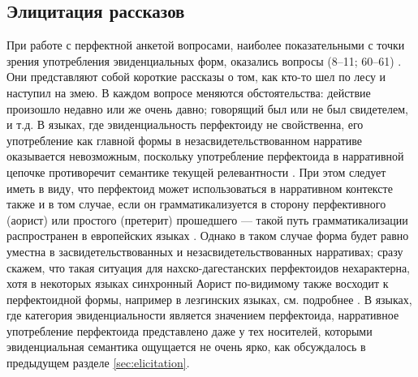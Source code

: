 \subsection{Элицитация рассказов} \label{sec:andinarr}

При работе с перфектной анкетой вопросами, наиболее показательными с точки зрения употребления эвиденциальных форм, оказались вопросы (8--11; 60--61) \citep[800--809]{dahl2000}. Они представляют собой короткие рассказы о том, как кто-то шел по лесу и наступил на змею. В каждом вопросе меняются обстоятельства: действие произошло недавно или же очень давно; говорящий был или не был свидетелем, и т.д. В языках, где эвиденциальность перфектоиду не свойственна, его употребление как главной формы в незасвидетельствованном нарративе оказывается невозможным, поскольку употребление перфектоида в нарративной цепочке противоречит семантике текущей релевантности \citep{lindstedt2000}. При этом следует иметь в виду, что перфектоид может использоваться в нарративном контексте также и в том случае, если он грамматикализуется в сторону перфективного (аорист) или простого (претерит) прошедшего --- такой путь грамматикализации распространен в европейских языках \citep{bybee1994}. Однако в таком случае форма будет равно уместна в засвидетельствованных и незасвидетельствованных нарративах; сразу скажем, что такая ситуация для нахско-дагестанских перфектоидов нехарактерна, хотя в некоторых языках синхронный Аорист по-видимому также восходит к перфектоидной формы, например в лезгинских языках, см. подробнее \citep{maisaklezgpf}. В языках, где категория эвиденциальности является значением перфектоида, нарративное употребление перфектоида представлено даже у тех носителей, которыми эвиденциальная семантика ощущается не очень ярко, как обсуждалось в предыдущем разделе \ref{sec:elicitation}. 

